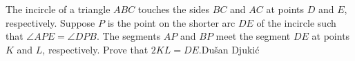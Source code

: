 The incircle of a triangle $ABC$ touches the sides $BC$ and $AC$ at points $D$ and $E$,  respectively. Suppose $P$ is the point on the shorter arc $DE$ of the incircle such that $\angle APE = \angle DPB$. The segments $AP$ and $BP$ meet the segment $DE$ at points $K$ and $L$,  respectively. Prove that $2KL = DE$.Dušan Djukić